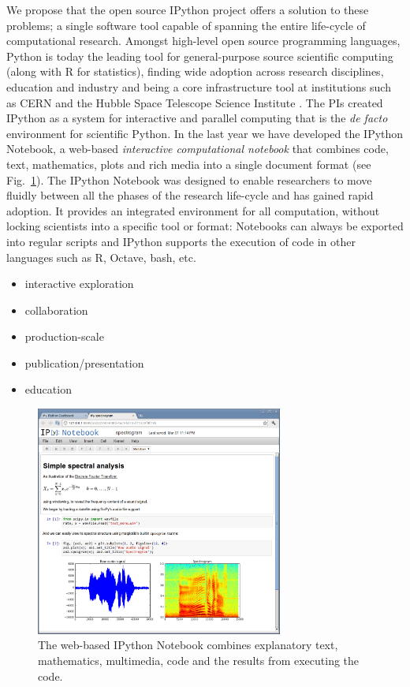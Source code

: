\documentclass[ChapterTOCs,krantz2]{krantz} %
\begin{document}
We propose that the open source IPython project \cite{PER-GRA:2007}
offers a solution to these problems; a single software tool capable
of spanning the entire life-cycle of computational research. Amongst
high-level open source programming languages, Python is today the
leading tool for general-purpose source scientific computing (along
with R for statistics), finding wide adoption across research disciplines,
education and industry and being a core infrastructure tool at institutions
such as CERN and the Hubble Space Telescope Science Institute \cite{Perez2011,ganga09,SST}.
The PIs created IPython as a system for interactive and parallel computing
that is the\emph{ de facto} environment for scientific Python. In
the last year we have developed the IPython Notebook, a web-based\emph{
interactive computational notebook} that combines code, text, mathematics,
plots and rich media into a single document format (see Fig.~\ref{fig:IPython-notebook}).
The IPython Notebook was designed to enable researchers to move fluidly
between all the phases of the research life-cycle and has gained rapid
adoption. It provides an integrated environment for all computation,
without locking scientists into a specific tool or format: Notebooks
can always be exported into regular scripts and IPython supports the
execution of code in other languages such as R, Octave, bash, etc.

\begin{itemize}

\item interactive exploration
\item collaboration
\item production-scale
\item publication/presentation
\item education

\end{itemize}
\begin{figure}
\begin{centering}
\includegraphics[width=3.2in]{fig/ipython-notebook-specgram.png}
\par\end{centering}

\caption{\label{fig:IPython-notebook}The web-based IPython Notebook combines
explanatory text, mathematics, multimedia, code and the results from
executing the code.}
\end{figure}
\end{document}
